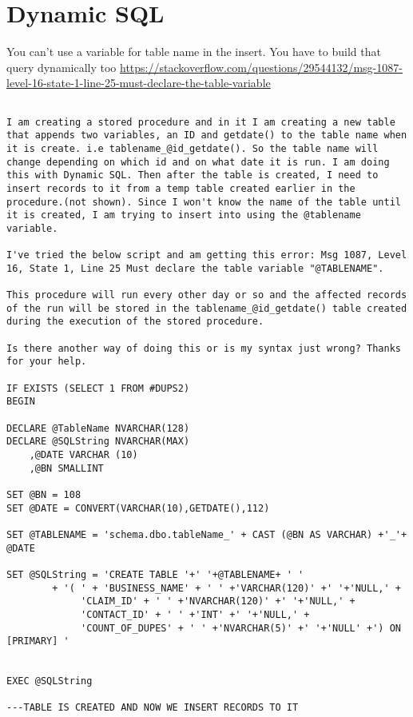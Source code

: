\newpage
\section{Dynamic SQL}

You can't use a variable for table name in the insert. You have to build that query dynamically too
\url{https://stackoverflow.com/questions/29544132/msg-1087-level-16-state-1-line-25-must-declare-the-table-variable}

\begin{lstlisting}

I am creating a stored procedure and in it I am creating a new table that appends two variables, an ID and getdate() to the table name when it is create. i.e tablename_@id_getdate(). So the table name will change depending on which id and on what date it is run. I am doing this with Dynamic SQL. Then after the table is created, I need to insert records to it from a temp table created earlier in the procedure.(not shown). Since I won't know the name of the table until it is created, I am trying to insert into using the @tablename variable.

I've tried the below script and am getting this error: Msg 1087, Level 16, State 1, Line 25 Must declare the table variable "@TABLENAME".

This procedure will run every other day or so and the affected records of the run will be stored in the tablename_@id_getdate() table created during the execution of the stored procedure.

Is there another way of doing this or is my syntax just wrong? Thanks for your help.

IF EXISTS (SELECT 1 FROM #DUPS2)
BEGIN

DECLARE @TableName NVARCHAR(128)
DECLARE @SQLString NVARCHAR(MAX)
    ,@DATE VARCHAR (10)
    ,@BN SMALLINT

SET @BN = 108       
SET @DATE = CONVERT(VARCHAR(10),GETDATE(),112)

SET @TABLENAME = 'schema.dbo.tableName_' + CAST (@BN AS VARCHAR) +'_'+ @DATE 

SET @SQLString = 'CREATE TABLE '+' '+@TABLENAME+ ' '
        + '( ' + 'BUSINESS_NAME' + ' ' +'VARCHAR(120)' +' '+'NULL,' +
             'CLAIM_ID' + ' ' +'NVARCHAR(120)' +' '+'NULL,' + 
             'CONTACT_ID' + ' ' +'INT' +' '+'NULL,' +
             'COUNT_OF_DUPES' + ' ' +'NVARCHAR(5)' +' '+'NULL' +') ON     [PRIMARY] '


EXEC @SQLString

---TABLE IS CREATED AND NOW WE INSERT RECORDS TO IT


\end{lstlisting}
